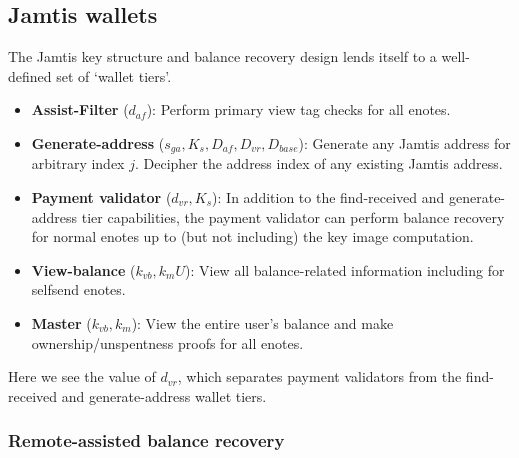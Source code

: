 \subsection{Jamtis wallets}
\label{subsec:jamtis-wallets}

The Jamtis key structure and balance recovery design lends itself to a well-defined set of `wallet tiers'.

\begin{itemize}
    \item \textbf{Assist-Filter} ($d_{af}$): Perform primary view tag checks for all enotes.

    \item \textbf{Generate-address} ($s_{ga}, K_s, D_{af}, D_{vr}, D_{base}$): Generate any Jamtis address for arbitrary index $j$. Decipher the address index of any existing Jamtis address.

    \item \textbf{Payment validator} ($d_{vr}, K_s$): In addition to the find-received and generate-address tier capabilities, the payment validator can perform balance recovery for normal enotes up to (but not including) the key image computation.

    \item \textbf{View-balance} ($k_{vb}, k_m U$): View all balance-related information including for selfsend enotes.

    \item \textbf{Master} ($k_{vb}, k_m$): View the entire user's balance and make ownership/unspentness proofs for all enotes.
\end{itemize}

Here we see the value of $d_{vr}$, which separates payment validators from the find-received and generate-address wallet tiers.

\subsubsection{Remote-assisted balance recovery}
\label{subsubsec:jamtis-wallets-remote-assisted}

